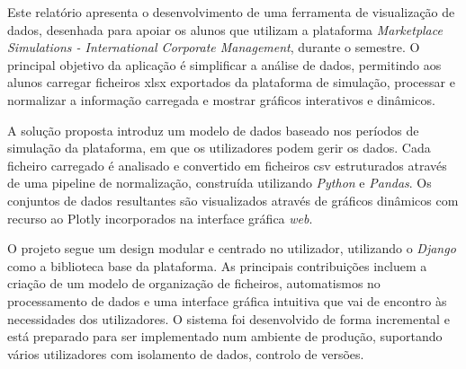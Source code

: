 




Este  relatório apresenta o desenvolvimento de uma ferramenta de visualização de dados, desenhada para apoiar os alunos que utilizam a  plataforma \textit{Marketplace Simulations - International Corporate Management}, durante o semestre. O principal objetivo da aplicação é simplificar a análise de dados, permitindo aos alunos carregar ficheiros \gls{xlsx} exportados da plataforma de simulação, processar e normalizar a informação carregada e mostrar gráficos interativos e dinâmicos.

A solução proposta introduz um modelo de dados baseado nos períodos de simulação da plataforma, em que os utilizadores podem gerir os dados. Cada ficheiro carregado é analisado e convertido em ficheiros \gls{csv} estruturados através de uma pipeline de normalização, construída utilizando \textit{Python} e \textit{Pandas}. Os conjuntos de dados resultantes são visualizados através de gráficos dinâmicos com recurso ao Plotly incorporados na interface gráfica \textit{web}.

O projeto segue um design modular e centrado no utilizador, utilizando o \textit{Django} como a biblioteca base da plataforma. As principais contribuições incluem a criação de um modelo de organização de ficheiros, automatismos no processamento de dados e uma interface gráfica intuitiva que vai de encontro às necessidades dos utilizadores. O sistema foi desenvolvido de forma incremental e está preparado para ser implementado num ambiente de produção, suportando vários utilizadores com isolamento de dados, controlo de versões.




